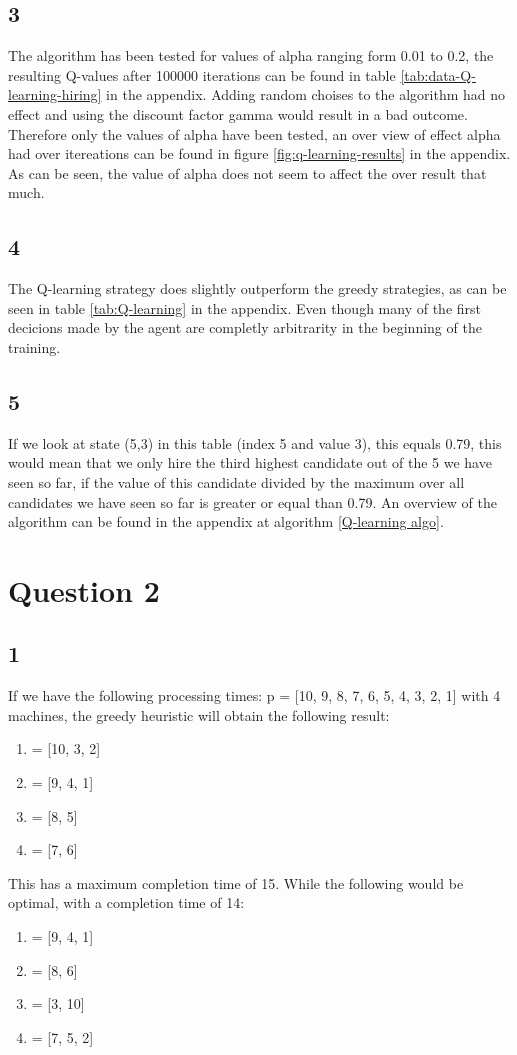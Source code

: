 \documentclass{article}
\begin{document}
\subsection*{3}
The algorithm has been tested for values of alpha ranging form 0.01 to 0.2, the resulting Q-values after 100000 iterations can be found in table \ref{tab:data-Q-learning-hiring} in the appendix. Adding random choises to the algorithm had no effect and using the discount factor gamma would result in a bad outcome. Therefore only the values of alpha have been tested, an over view of effect alpha had over itereations can be found in figure \ref{fig:q-learning-results} in the appendix. As can be seen, the value of alpha does not seem to affect the over result that much. 
\subsection*{4}
 The Q-learning strategy does slightly outperform the greedy strategies, as can be seen in table \ref{tab:Q-learning} in the appendix. Even though many of the first decicions made by the agent are completly arbitrarity in the beginning of the training.  
\subsection*{5}
If we look at state (5,3) in this table (index 5 and value 3), this equals 0.79, this would mean that we only hire the third highest candidate out of the 5 we have seen so far, if the value of this candidate divided by the maximum over all candidates we have seen so far is greater or equal than 0.79. An overview of the algorithm can be found in the appendix at algorithm \ref{Q-learning algo}. 
\section*{Question 2}
\subsection*{1}
If we have the following processing times: p = [10, 9, 8, 7, 6, 5, 4, 3, 2, 1] with 4 machines, the greedy heuristic will obtain the following result:  
\begin{enumerate}
	\item = [10, 3, 2]
	\item = [9, 4, 1]
	\item = [8, 5]
	\item = [7, 6] 
\end{enumerate}
This has a maximum completion time of 15. While the following would be optimal, with a completion time of 14:
\begin{enumerate}
	\item = [9, 4, 1]
	\item = [8, 6]
	\item = [3, 10]
	\item = [7, 5, 2] 
\end{enumerate}
\end{document}
